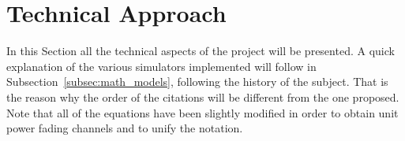 \section{Technical Approach}	%
\label{sec:technical_approach}

In this Section all the technical aspects of the project will be presented. A quick explanation of the various simulators implemented will follow in Subsection~\ref{subsec:math_models}, following the history of the subject. That is the reason why the order of the citations will be different from the one proposed. Note that all of the equations have been slightly modified in order to obtain unit power fading channels and to unify the notation.





